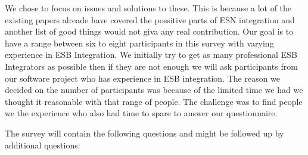 \documentclass{llncs}
\begin{document}
We chose to focus on issues and solutions to these. This is because a lot of the existing papers alreade have covered the possitive parts of ESN integration and another list of good things would not giva any real contribution.
Our goal is to have a range between six to eight participants in this survey with varying experience in ESB Integration. We initially try to get as many professional ESB Integrators as possible then if they are not enough we will ask participants from our software project who has experience in ESB integration. The reason we decided on the number of participants was because of the limited time we had we thought it reasonable with that range of people. The challenge was to find people we the experience who also had time to spare to answer our questionnaire. 

The survey will contain the following questions and might be followed up by additional questions:
\label{survey}
\end{document}
